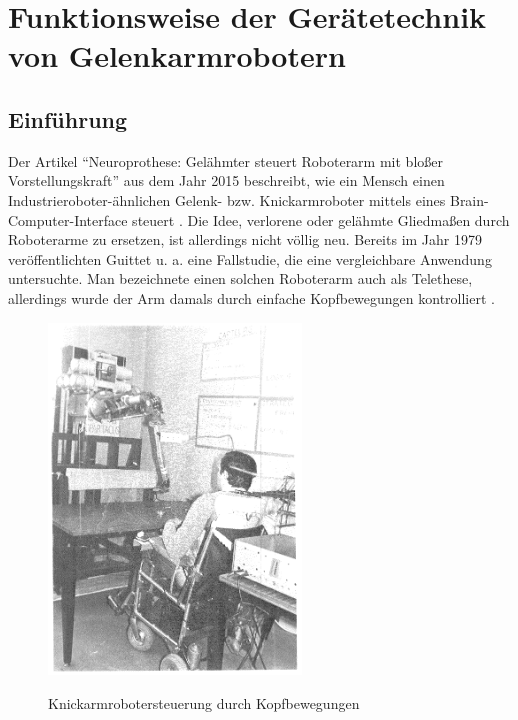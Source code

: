 \documentclass[11pt,ngerman,parskip=half]{scrartcl}
\begin{document}
\section{Funktionsweise der Gerätetechnik von Gelenkarmrobotern}
\label{sec:john}
\subsection{Einführung}
\label{subsec:john_einfuehrung}
Der Artikel \enquote{Neuroprothese: Gelähmter steuert Roboterarm mit bloßer
Vorstellungskraft} aus dem Jahr 2015 beschreibt, wie ein Mensch einen
Industrieroboter-ähnlichen Gelenk- bzw. Knickarmroboter mittels eines
Brain-Computer-Interface steuert
\parencite[vgl.][]{merkelt_neuroprothesen:_2015}. Die Idee, verlorene oder
gelähmte Gliedmaßen durch Roboterarme zu ersetzen, ist allerdings nicht völlig
neu. Bereits im Jahr 1979 veröffentlichten Guittet u. a. eine Fallstudie, die
eine vergleichbare Anwendung untersuchte. Man bezeichnete einen solchen
Roboterarm auch als Telethese, allerdings wurde der Arm damals durch einfache
Kopfbewegungen kontrolliert \parencite[vgl.][]{guittet_spartacus_1979}.

\begin{figure}[H]
  \centering
  \includegraphics[width=0.6\textwidth]{src/img/john1.png}
  \caption{Knickarmrobotersteuerung durch Kopfbewegungen}
  \label{img:john1}
  \parencite[][84]{guittet_spartacus_1979}
\end{figure}
\newpage
\end{document}
